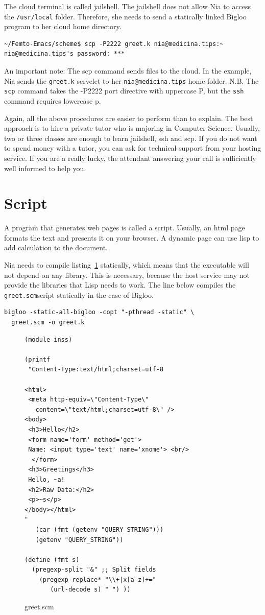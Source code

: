 \documentclass[a4paper,12pt]{book}
\newenvironment{fmpage}[1]
           {\begin{lrbox}{\fmbox}\begin{minipage}{#1}}
           {\end{minipage}\end{lrbox}\fbox{\usebox{\fmbox}}}
\begin{document}
The cloud terminal  is called
jailshell. The jailshell does not allow Nia
to access the \verb|/usr/local| folder.
Therefore, she needs to send a statically linked
Bigloo program to her cloud home directory.
\begin{Verbatim}[fontsize=\small,
frame=single,
framerule=0.5mm]
~/Femto-Emacs/scheme$ scp -P2222 greet.k nia@medicina.tips:~
nia@medicina.tips's password: ***
\end{Verbatim}
An important note: The scp command sends files to
the cloud. In the example, Nia sends the \verb|greet.k|
servelet to  her  \verb|nia@medicina.tips| home folder.
N.B. The \verb|scp| command takes the -P2222
port directive with uppercase P,
but the \verb|ssh| command requires lowercase p.

Again, all the above procedures are easier to perform
than to explain. The best approach is to hire a private
tutor who is  majoring in Computer Science.
Usually, two or three classes are enough to
learn jailshell, ssh and scp.
If you do not want to spend money with
a tutor,  you can ask for
technical support from your hosting service. 
If you are a really lucky, the attendant
answering your call is sufficiently well
informed to help you.

\section{Script}
A program that generates
web pages is called a script.
Usually, an html page formats the text
and presents it on your browser.
A dynamic page can use lisp to add
calculation to the document.

Nia needs to compile listing~\ref{lst:greet.scm} statically,
which means that the executable will not depend on any
library. This is necessary, because the host service may not
provide the libraries that Lisp needs to work. The line below
compiles the \verb|greet.scm|script  statically in the case
of Bigloo.
\begin{verbatim}
bigloo -static-all-bigloo -copt "-pthread -static" \
  greet.scm -o greet.k
\end{verbatim}


\begin{figure}[!h]
\begin{fmpage}{0.95\textwidth}
\begin{verbatim}
(module inss)

(printf
 "Content-Type:text/html;charset=utf-8

<html>
 <meta http-equiv=\"Content-Type\" 
   content=\"text/html;charset=utf-8\" />
<body>
 <h3>Hello</h2>
 <form name='form' method='get'>
 Name: <input type='text' name='xnome'> <br/>
  </form>
 <h3>Greetings</h3>
 Hello, ~a!
 <h2>Raw Data:</h2>
 <p>~s</p>
</body></html>
" 
   (car (fmt (getenv "QUERY_STRING")))
   (getenv "QUERY_STRING")) 

(define (fmt s)
  (pregexp-split "&" ;; Split fields
    (pregexp-replace* "\\+|x[a-z]+="
       (url-decode s) " ") ))		  
\end{verbatim}
\end{fmpage}
\caption{greet.scm}
\label{lst:greet.scm}
\end{figure}
\end{document}
